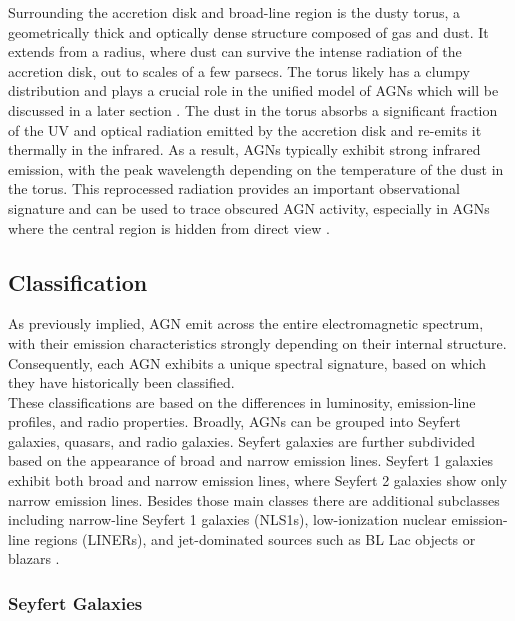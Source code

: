 Surrounding the accretion disk and broad-line region is the dusty torus, a geometrically thick and optically dense structure composed of gas and dust. It extends from a radius, where dust can survive the intense radiation of the accretion disk, out to scales of a few parsecs. The torus likely has a clumpy distribution and plays a crucial role in the unified model of AGNs which will be discussed in a later section \parencite{netzer2013agn,hickox2018obscured}.
The dust in the torus absorbs a significant fraction of the UV and optical radiation emitted by the accretion disk and re-emits it thermally in the infrared. As a result, AGNs typically exhibit strong infrared emission, with the peak wavelength depending on the temperature of the dust in the torus. This reprocessed radiation provides an important observational signature and can be used to trace obscured AGN activity, especially in AGNs where the central region is hidden from direct view \parencite{netzer2013agn}.





\subsection{Classification}
\label{sec:classification}
As previously implied, AGN emit across the entire electromagnetic spectrum, with their emission characteristics strongly depending on their internal structure. Consequently, each AGN exhibits a unique spectral signature, based on which they have historically been classified.\\
These classifications are based on the differences in luminosity, emission-line profiles, and radio properties. Broadly, AGNs can be grouped into Seyfert galaxies, quasars, and radio galaxies. Seyfert galaxies are further subdivided based on the appearance of broad and narrow emission lines. Seyfert 1 galaxies exhibit both broad and narrow emission lines, where Seyfert 2 galaxies show only narrow emission lines. Besides those main classes there are additional subclasses including narrow-line Seyfert 1 galaxies (NLS1s), low-ionization nuclear emission-line regions (LINERs), and jet-dominated sources such as BL Lac objects or blazars \parencite{antonucci1993unified, urry1995unified}.

\subsubsection{Seyfert Galaxies}

